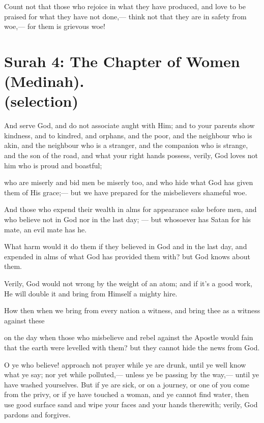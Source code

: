 \documentclass[fontsize=14pt, letterpaper, notitlepage, openany, DIV=12]{scrbook} %
\begin{document}
\noindent[3:188]
Count not that those who rejoice in what they have produced, and love to be praised for
what they have not done,--- think not that they are in safety from woe,--- for them is grievous
woe!



\section[Surah 4: The Chapter of Women (Medinah).]{Surah 4: The Chapter of Women (Medinah).\\ (selection)}


\noindent[4:36]
And serve God, and do not associate aught with Him; and to your parents show kindness,
and to kindred, and orphans, and the poor, and the neighbour who is akin, and the neighbour who
is a stranger, and the companion who is strange, and the son of the road, and what your right
hands possess, verily, God loves not him who is proud and boastful;

\noindent[4:37]
who are miserly and bid men be miserly too, and who hide what God has given them of
His grace;--- but we have prepared for the misbelievers shameful woe.

\noindent[4:38]
And those who expend their wealth in alms for appearance sake before men, and who
believe not in God nor in the last day; --- but whosoever has Satan for his mate, an evil mate has
he.

\noindent[4:39]
What harm would it do them if they believed in God and in the last day, and expended in
alms of what God has provided them with? but God knows about them.

\noindent[4:40]
Verily, God would not wrong by the weight of an atom; and if it's a good work, He will
double it and bring from Himself a mighty hire.

\noindent[4:41]
How then when we bring from every nation a witness, and bring thee as a witness against
these

\noindent[4:42]
on the day when those who misbelieve and rebel against the Apostle would fain that the
earth were levelled with them? but they cannot hide the news from God.

\noindent[4:43]
O ye who believe! approach not prayer while ye are drunk, until ye well know what ye
say; nor yet while polluted,--- unless ye be passing by the way,--- until ye have washed
yourselves. But if ye are sick, or on a journey, or one of you come from the privy, or if ye have
touched a woman, and ye cannot find water, then use good surface sand and wipe your faces and
your hands therewith; verily, God pardons and forgives.
\end{document}
